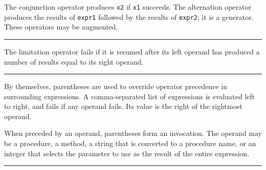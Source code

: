 \noindent
The conjunction operator produces \texttt{x2} if
\texttt{x1} succeeds. The alternation operator produces the results of \texttt{expr1} followed
by the results of \texttt{expr2}; it is a generator.
These operators may be augmented.

\bigskip\hrule\vspace{0.1cm}

\noindent
The limitation operator fails if it
is resumed after its left operand has produced a number of results
equal to its right operand.

\bigskip\hrule\vspace{0.1cm}


\noindent
By themselves, parentheses are used
to override operator precedence in surrounding expressions. A
comma-separated list of expressions is evaluated left to right, and
fails if any operand fails. Its value is the right of the rightmost
operand.

When preceded by an operand, parentheses form an invocation. The operand may be a procedure, a method, a
string that is converted to a procedure name, or an integer that
selects the parameter to use as the result of the entire expression.

\bigskip\hrule\vspace{0.1cm}







